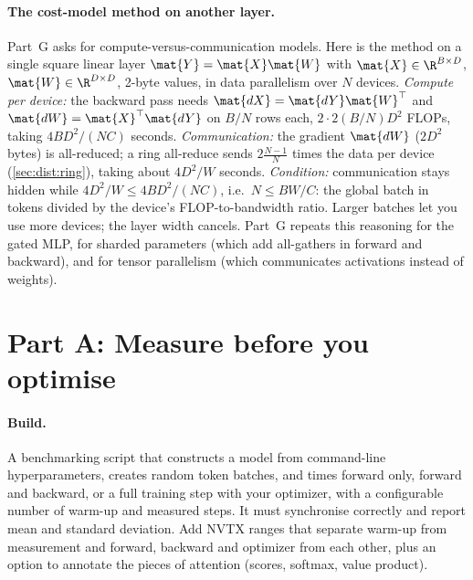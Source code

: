 \paragraph{The cost-model method on another layer.} Part~G asks for compute-versus-communication
models. Here is the method on a single square linear layer $\mat{Y}=\mat{X}\mat{W}$ with
$\mat{X}\in\R^{B\times D}$, $\mat{W}\in\R^{D\times D}$, 2-byte values, in data parallelism over
$N$ devices. \emph{Compute per device:} the backward pass needs $\mat{dX}=\mat{dY}\mat{W}^\top$ and
$\mat{dW}=\mat{X}^\top\mat{dY}$ on $B/N$ rows each, $2\cdot2(B/N)D^2$ FLOPs, taking
$4BD^2/(NC)$ seconds. \emph{Communication:} the gradient $\mat{dW}$ ($2D^2$ bytes) is all-reduced; a
ring all-reduce sends $2\frac{N-1}{N}$ times the data per device (\cref{sec:dist:ring}), taking about
$4D^2/W$ seconds. \emph{Condition:} communication stays hidden while $4D^2/W\le4BD^2/(NC)$, i.e.\
$N\le BW/C$: the global batch in tokens divided by the device's FLOP-to-bandwidth ratio. Larger batches
let you use more devices; the layer width cancels. Part~G repeats this reasoning for the gated MLP,
for sharded parameters (which add all-gathers in forward and backward), and for tensor parallelism
(which communicates activations instead of weights).

\section{Part A: Measure before you optimise}\label{sec:proj2:a}

\paragraph{Build.} A benchmarking script that constructs a model from command-line hyperparameters,
creates random token batches, and times forward only, forward and backward, or a full training step
with your optimizer, with a configurable number of warm-up and measured steps. It must synchronise
correctly and report mean and standard deviation. Add NVTX ranges that separate warm-up from
measurement and forward, backward and optimizer from each other, plus an option to annotate the
pieces of attention (scores, softmax, value product).

